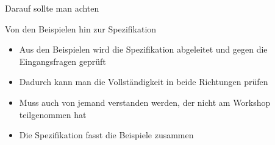\begin{frame}{Darauf sollte man achten}




\end{frame}



\begin{frame}{Von den Beispielen hin zur Spezifikation}

\begin{itemize}
	\item Aus den Beispielen wird die Spezifikation abgeleitet und gegen die Eingangsfragen geprüft
	\item Dadurch kann man die Vollständigkeit in beide Richtungen prüfen
	\item Muss auch von jemand verstanden werden, der nicht am Workshop teilgenommen hat
	\item Die Spezifikation fasst die Beispiele zusammen
\end{itemize}

\end{frame}
 
